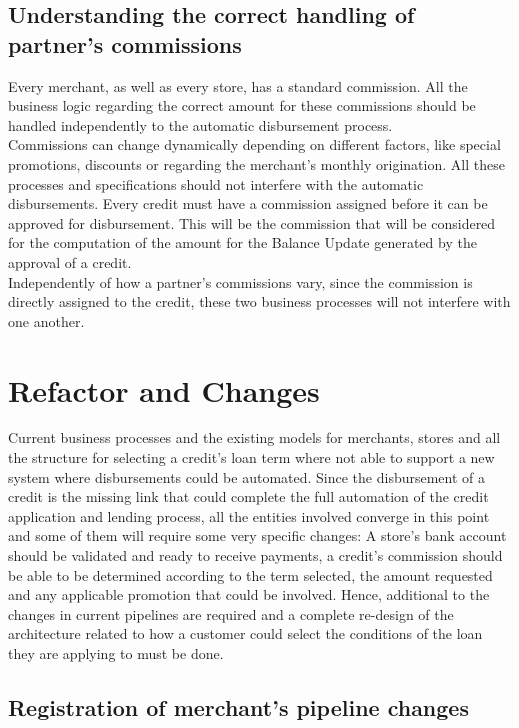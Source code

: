 \subsection{Understanding the correct handling of partner’s commissions}

Every merchant, as well as every store, has a standard commission. All the business logic regarding the correct amount for these commissions should be handled independently to the automatic disbursement process. \\

Commissions can change dynamically depending on different factors, like special promotions, discounts or regarding the merchant’s monthly origination. All these processes and specifications should not interfere with the automatic disbursements. Every credit must have a commission assigned before it can be approved for disbursement. This will be the commission that will be considered for the computation of the amount for the Balance Update generated by the approval of a credit. \\

Independently of how a partner’s commissions vary, since the commission is directly assigned to the credit, these two business processes will not interfere with one another.

\section{Refactor and Changes}

Current business processes and the existing models for merchants, stores and all the structure for selecting a credit’s loan term where not able to support a new system where disbursements could be automated. Since the disbursement of a credit is the missing link that could complete the full automation of the credit application and lending process, all the entities involved converge in this point and some of them will require some very specific changes: A store’s bank account should be validated and ready to receive payments, a credit’s commission should be able to be determined according to the term selected, the amount requested and any applicable promotion that could be involved. Hence, additional to the changes in current pipelines are required and a complete re-design of the architecture related to how a customer could select the conditions of the loan they are applying to must be done.

\subsection{Registration of merchant’s pipeline changes}

